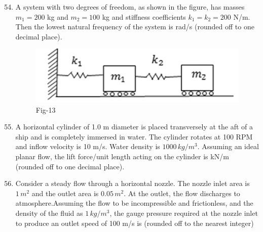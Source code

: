 \documentclass[journal]{IEEEtran}
\theoremstyle{remark}
\begin{document}
\begin{enumerate}[itemsep=1em]
\setcounter{enumi}{53}
\item A system with two degrees of freedom, as shown in the figure, has masses $m_1=200$ kg and  $m_2=100$ kg and stiffness coefficients $k_1=k_2=200$ N/m.  \\
Then the lowest natural frequency of the system is \underline{\hspace{1cm}} rad/s (rounded off to one decimal place).
\begin{figure}[H]
    \centering
    \includegraphics[width=0.4\columnwidth]{figs/fig-13.jpeg}
    \caption*{Fig-13}
    \label{fig-13}
\end{figure}
\end{enumerate}

\newpage
\vspace*{0.25cm}

\begin{enumerate}[itemsep=1em]
\setcounter{enumi}{54}
\item A horizontal cylinder of 1.0 m diameter is placed transversely at the aft of a ship and is completely immersed in water. The cylinder rotates at 100 RPM and inflow velocity is 10 m/s. Water density is $1000\, kg/m^3$. Assuming an ideal planar flow, the lift force/unit length acting on the cylinder is \underline{\hspace{1cm}} kN/m (rounded off to one decimal place). 
\end{enumerate}

\begin{enumerate}[itemsep=1em]
\setcounter{enumi}{55}
\item Consider a steady flow through a horizontal nozzle. The nozzle inlet area is $1 \,m^2$ and the outlet area is $0.05 \,m^2$. At the outlet, the flow discharges to atmosphere.Assuming the flow to be incompressible and frictionless, and the density of the fluid as $1\, kg/m^3$, the gauge pressure required at the nozzle inlet to produce an outlet speed of 100 m/s is \underline{\hspace{1cm}} (rounded off to the nearest integer)
\end{enumerate}
\end{document}
